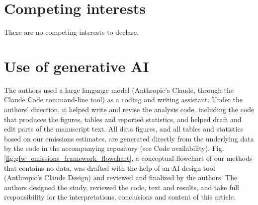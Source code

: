 \documentclass[lineno,pdflatex,sn-nature]{sn-jnl}
\begin{document}
\section*{Competing interests}

There are no competing interests to declare.

\section*{Use of generative AI}

The authors used a large language model (Anthropic's Claude, through the Claude Code command-line tool) as a coding and writing assistant. Under the authors' direction, it helped write and revise the analysis code, including the code that produces the figures, tables and reported statistics, and helped draft and edit parts of the manuscript text. All data figures, and all tables and statistics based on our emissions estimates, are generated directly from the underlying data by the code in the accompanying repository (see Code availability). Fig. \ref{fig:gfw_emissions_framework_flowchart}, a conceptual flowchart of our methods that contains no data, was drafted with the help of an AI design tool (Anthropic's Claude Design) and reviewed and finalized by the authors. The authors designed the study, reviewed the code, text and results, and take full responsibility for the interpretations, conclusions and content of this article.






\ifdefined\combinedbuild
\newpage

\fi
\end{document}

